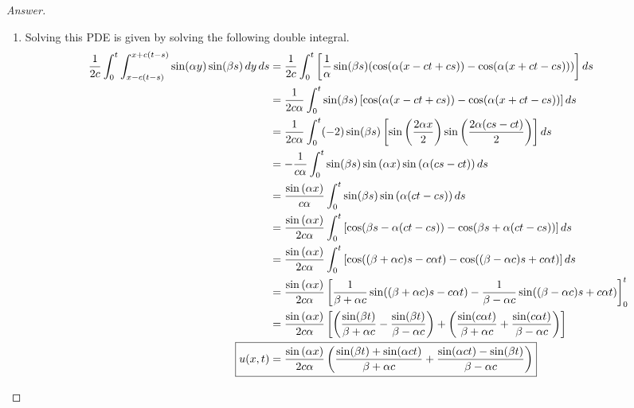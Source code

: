 \documentclass{article}
\theoremstyle{definition}
\renewcommand\qedsymbol{$\blacksquare$}
\newenvironment{ans}{\begin{proof}[Answer]\renewcommand{\qedsymbol}{}}{\end{proof}}
\begin{document}
\begin{ans}
\begin{enumerate}[(1), series=answers]
            \item Solving this PDE is given by solving the following double integral. \begin{align*}
                \frac{1}{2c}\int_0^t\int_{x-c(t-s)}^{x+c(t-s)}\sin(\alpha y)\sin(\beta s)\,dy\,ds
                &= \frac{1}{2c}\int_0^t\left[ \frac{1}{\alpha}\sin(\beta s)(\cos(\alpha(x-ct+cs))-\cos(\alpha(x+ct-cs)))\right]ds\\
                &= \frac{1}{2c\alpha}\int_0^t\sin(\beta s)\left[\cos(\alpha(x-ct+cs))-\cos(\alpha(x+ct-cs))\right]ds\\
                &= \frac{1}{2c\alpha}\int_0^t(-2)\sin(\beta s)\left[\sin\left(\frac{2\alpha x}{2}\right)\sin\left(\frac{2\alpha(cs-ct)}{2}\right)\right]ds\\
                &= -\frac{1}{c\alpha}\int_0^t\sin(\beta s)\sin\left(\alpha x\right)\sin\left(\alpha(cs-ct)\right)ds\\
                &= \frac{\sin\left(\alpha x\right)}{c\alpha}\int_0^t\sin(\beta s)\sin\left(\alpha(ct-cs)\right)ds\\
                &= \frac{\sin\left(\alpha x\right)}{2c\alpha}\int_0^t\left[\cos(\beta s - \alpha(ct-cs)) - \cos(\beta s + \alpha(ct-cs))\right]ds\\
                &=\frac{\sin\left(\alpha x\right)}{2c\alpha}\int_0^t\left[\cos((\beta+\alpha c)s - c\alpha t) - \cos((\beta-\alpha c)s + c\alpha t)\right]ds\\
                &=
                \frac{\sin\left(\alpha x\right)}{2c\alpha}\left[\frac{1}{\beta + \alpha c}\sin((\beta+\alpha c)s - c\alpha t) - \frac{1}{\beta - \alpha c}\sin((\beta-\alpha c)s + c\alpha t)\right]_0^t\\
                &=\frac{\sin\left(\alpha x\right)}{2c\alpha}\left[\left(\frac{\sin(\beta t)}{\beta + \alpha c} - \frac{\sin(\beta t)}{\beta - \alpha c} \right) + \left(\frac{\sin(c\alpha t)}{\beta + \alpha c} + \frac{\sin(c\alpha t)}{\beta - \alpha c} \right)\right]\\
                \Aboxed{u(x,t) &= \frac{\sin\left(\alpha x\right)}{2c\alpha}\left(\frac{\sin(\beta t) + \sin(\alpha ct)}{\beta + \alpha c} + \frac{\sin(\alpha ct) - \sin(\beta t)}{\beta - \alpha c}\right)}
                \end{align*}


\end{enumerate}
\end{ans}
\end{document}
